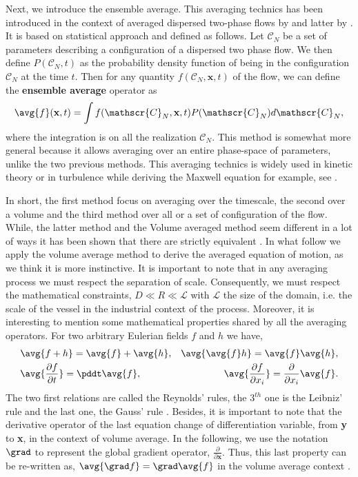 Next, we introduce the ensemble average. 
This averaging technics has been introduced in the context of averaged dispersed 
two-phase flows by \citet{batchelor1972sedimentation,hinch1977averaged} and latter by \citet{zhang1994averaged}.
It is based on statistical approach and defined as follows. 
Let $\mathscr{C}_N$ be a set of parameters describing a configuration of a dispersed two phase flow. 
We then define $P(\mathscr{C}_N,t)$ as the probability density function of being in the configuration $\mathscr{C}_N$ at the time $t$. 
Then for any quantity $f(\mathscr{C}_N,\textbf{x},t)$ of the flow, we can define the \textbf{ensemble average} operator as
\begin{equation}
    \label{eq:enselblea}
    \avg{f}(\textbf{x},t) 
    = \int f(\mathscr{C}_N,\textbf{x},t) P(\mathscr{C}_N)d\mathscr{C}_N,
\end{equation}
where the integration is on all the realization $\mathscr{C}_N$. 
This method is somewhat more general because it allows averaging over an entire 
phase-space of parameters, unlike the two previous methods. 
This averaging technics is widely used in kinetic theory or in turbulence while deriving the Maxwell equation  for example, see \citet[Chapter 7]{rao2008introduction}.  

In short, the first method focus on averaging over the timescale, the second over a volume and the third method over all or a set of configuration of the flow.
While, the latter method and the Volume averaged method seem different in a lot of ways it has been shown that there are strictly equivalent \citet{jackson1997locally,zhang1994ensemble}.
In what follow we apply the volume average method to derive the averaged equation of motion, as we think it is more instinctive.
It is important to note that in any averaging process we must respect the separation of 
scale. 
Consequently, we must respect the mathematical constraints, $D\ll R\ll \mathcal{L}$ with $\mathcal{L}$ the size of the domain, i.e. the scale of the vessel in the industrial context of the process. 
Moreover, it is interesting to mention some mathematical properties shared by all the averaging operators. 
For two arbitrary Eulerian fields $f$ and $h$ we have,
\begin{align}
    &\avg{f+h} = \avg{f}+\avg{h}, 
    &\avg{\avg{f}h} = \avg{f}\avg{h}, \nonumber \\
    &\avg{\frac{\partial f}{\partial t}} 
    = \pddt\avg{f}, 
    &\avg{\frac{\partial f}{\partial x_i}}
    = \frac{\partial}{\partial x_i}\avg{f}. 
    \label{eq:avg_properties}
\end{align}
The two first relations are called the Reynolds' rules, the $3^{th}$ one is the Leibniz' 
rule and the last one, the Gauss' rule \citep{drew1983mathematical}.
Besides, it is important to note that the derivative operator of the last equation change of differentiation variable, from \textbf{y} to \textbf{x}, in the context of volume average.
In the following, we use the notation $\grad$ to represent the global gradient operator, $\frac{\partial}{\partial \textbf{x}}$.
Thus, this last property can be re-written as, $\avg{\grad f}= \grad \avg{f}$ in the volume average context \citep{jackson1997locally}.

